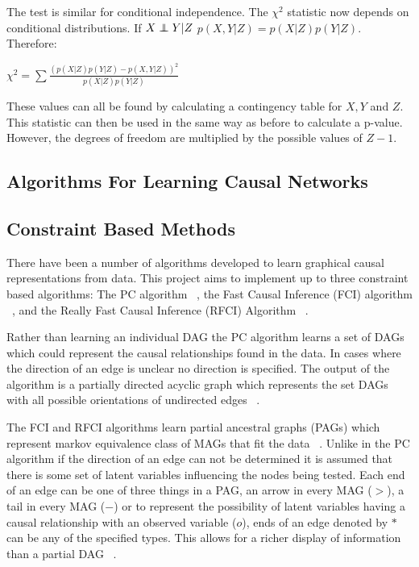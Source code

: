 \documentclass{UoYCSproject}
\newcommand\independent{\protect\mathpalette{\protect\independenT}{\perp}}
\def\independenT#1#2{\mathrel{\rlap{$#1#2$}\mkern2mu{#1#2}}}
\begin{document}
The test is similar for conditional independence. The $\chi^2$ statistic now depends on conditional distributions. If $X \independent Y | Z$ $p(X,Y|Z) = p(X|Z)p(Y|Z)$. Therefore:\\

\begin{center}
	$\chi^2 = \sum\frac{(p(X|Z)p(Y|Z)-p(X,Y|Z))^2}{p(X|Z)p(Y|Z)}$
\end{center}

These values can all be found by calculating a contingency table for $X,Y $ and $ Z$.\\

This statistic can then be used in the same way as before to calculate a p-value. However, the degrees of freedom are multiplied by the possible values of $Z -1$. 

\subsection{Algorithms For Learning Causal Networks}
\subsection{Constraint Based Methods}
There have been a number of algorithms developed to learn graphical causal representations from data. This project aims to implement up to three constraint based algorithms: The PC algorithm ~\parencite{spirtes1991algorithm}, the Fast Causal Inference (FCI) algorithm ~\parencite{colombo2012learning}, and the Really Fast Causal Inference (RFCI) Algorithm ~\parencite{colombo2012learning}.

Rather than learning an individual DAG the PC algorithm learns a set of DAGs which could represent the causal relationships found in the data. In cases where the direction of an edge is unclear no direction is specified. The output of the algorithm is a partially directed acyclic graph which represents the set DAGs with all possible orientations of undirected edges ~\parencite{spirtes1991algorithm}.

The FCI and RFCI algorithms learn partial ancestral graphs (PAGs) which represent markov equivalence class of MAGs that fit the data  ~\parencite{colombo2012learning}. Unlike in the PC algorithm if the direction of an edge can not be determined it is assumed that there is some set of latent variables influencing the nodes being tested. Each end of an edge can be one of three things in a PAG, an arrow in every MAG ($>$), a tail in every MAG ($-$) or to represent the possibility of latent variables having a causal relationship with an observed variable ($o$), ends of an edge denoted by $*$ can be any of the specified types. This allows for a richer display of information than a partial DAG ~\parencite{colombo2012learning}.
\end{document}
